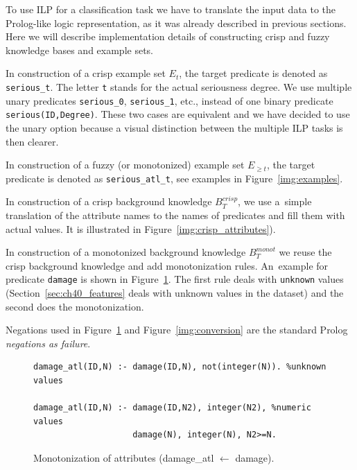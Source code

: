 To use ILP for a classification task we have to translate the input data to the Prolog-like logic representation, as it was already described in previous sections. Here we will describe implementation details of constructing crisp and fuzzy knowledge bases and example sets.

In construction of a crisp example set $E_t$, the target predicate is denoted as \texttt{serious\_t}. The letter \texttt{t} stands for the actual seriousness degree. We use multiple unary predicates \texttt{serious\_0}, \texttt{serious\_1}, etc., instead of one binary predicate \texttt{serious(ID,Degree)}. These two cases are equivalent and we have decided to use the unary option because a visual distinction between the multiple ILP tasks is then clearer.

In construction of a fuzzy (or monotonized) example set $E_{\ge t}$, the target predicate is denoted as \texttt{serious\_atl\_t}, see examples in Figure~\ref{img:examples}.



In construction of a crisp background knowledge $B^{crisp}_{T}$, we use a~simple translation of the attribute names to the names of predicates and fill them with actual values. It is illustrated in Figure~\ref{img:crisp_attributes}). 



In construction of a monotonized background knowledge $B^{monot}_T$ we reuse the crisp background knowledge and add monotonization rules. An~example for predicate \texttt{damage} is shown in Figure~\ref{img:attribute_monotonization}.
The first rule deals with \texttt{unknown} values (Section~\ref{sec:ch40_features} deals with unknown values in the dataset) and the second does the monotonization. 

Negations used in Figure~\ref{img:attribute_monotonization} and Figure~\ref{img:conversion} are the standard Prolog \emph{negations as failure}.



\begin{figure}	
\begin{verbatim}
damage_atl(ID,N) :- damage(ID,N), not(integer(N)). %unknown values

damage_atl(ID,N) :- damage(ID,N2), integer(N2), %numeric values
                    damage(N), integer(N), N2>=N.
\end{verbatim}						
	\caption{Monotonization of attributes (damage\_atl $\leftarrow$ damage).}
	\label{img:attribute_monotonization}
\end{figure}


